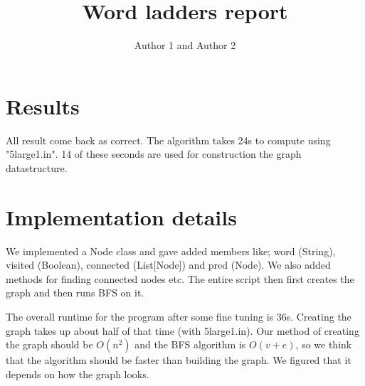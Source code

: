 \documentclass{article}
\title{Word ladders report}
\author{Author 1 and Author 2}
\begin{document}
  \maketitle

  \section{Results}

  
  All result come back as correct. The algorithm takes 24s to compute using "5large1.in". 14 of these seconds are used for construction the graph datastructure.
  

  \section{Implementation details}

  
  We implemented a Node class and gave added members like; word (String), visited (Boolean), connected (List[Node]) and pred (Node). We also added methods for finding connected nodes etc. The entire script then first creates the graph and then runs BFS on it.
  
  The overall runtime for the program after some fine tuning is 36s. Creating the graph takes up about half of that time (with 5large1.in). Our method of creating the graph should be $O(n^2)$ and the BFS algorithm is $O(v+e)$, so we think that the algorithm should be faster than building the graph. We figured that it depends on how the graph looks.
\end{document}
